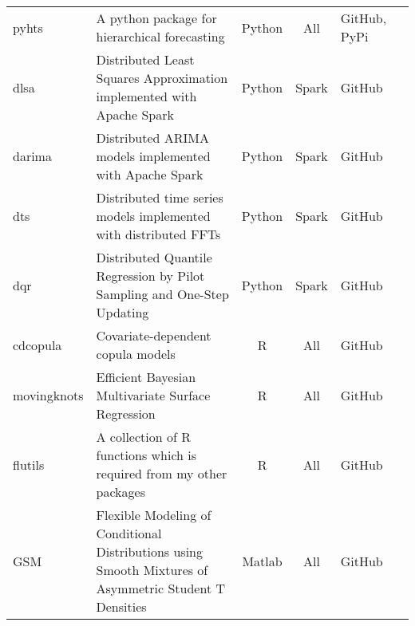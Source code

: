 \documentclass[twoside,a4paper,11pt]{article}
\begin{document}
\begin{refsection}
\begin{center}
{\begin{tabular}{lp{6cm}cclp{3cm}}
pyhts         & A python package for hierarchical forecasting                                                                                           & Python   & All         & GitHub, PyPi & \citet{ZhangB2023OptimalReconciliation}                     \\
dlsa          & Distributed Least Squares Approximation implemented with Apache Spark                                                                   & Python   & Spark       & GitHub       & \citet{ZhuX2021LeastSquareApproximation}                    \\
darima        & Distributed ARIMA models implemented with Apache Spark                                                                                  & Python   & Spark       & GitHub       & \citet{WangX2023DistributedARIMA}                           \\
dts           & Distributed time series models implemented with distributed FFTs                                                                        & Python   & Spark       & GitHub                                                                     \\
dqr           & Distributed Quantile Regression by Pilot Sampling and One-Step Updating                                                                 & Python   & Spark       & GitHub       & \citet{PanR2022NoteDistributed}                             \\
cdcopula      & Covariate-dependent copula models                                                                                                       & R        & All         & GitHub       & \citet{LiF2018ImprovingForecasting}                         \\
movingknots   & Efficient Bayesian Multivariate Surface Regression                                                                                      & R        & All         & GitHub       & \citet{LiF2013EfficientBayesian}                            \\
flutils       & A collection of R functions which is required from my other packages                                                                    & R        & All         & GitHub                                                                     \\
GSM           & Flexible Modeling of Conditional Distributions using Smooth Mixtures of Asymmetric Student T Densities                                  & Matlab   & All         & GitHub       & \citet{LiF2010FlexibleModeling}                             \\
  \bottomrule
\end{tabular}
}
\end{center}

\end{refsection}
\end{document}
